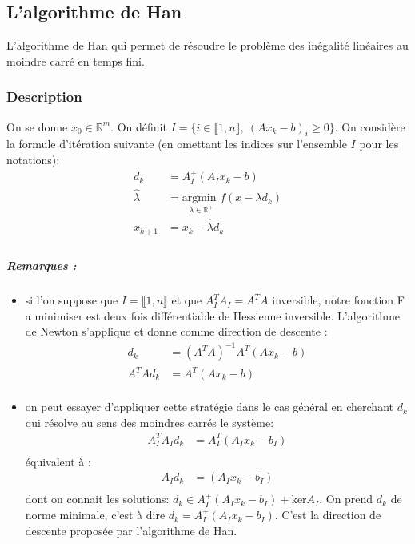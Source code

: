 \documentclass[10pt,a4paper]{article}
\begin{document}
\subsection{L'algorithme de Han}

L'algorithme de Han \cite{hanalgo} qui permet de résoudre le problème des inégalité linéaires au moindre carré en temps fini.

\subsubsection{Description}
On se donne $x_0 \in \mathbb{R}^m$.
On définit $I=\lbrace i \in \llbracket 1,n \rrbracket, \ (Ax_k - b)_i \ge 0 \rbrace$.
On considère la formule d'itération suivante (en omettant les indices sur l'ensemble $I$ pour les notations):
\begin{equation}
\begin{aligned}
  d_k & = A_I^+(A_I x_k - b)\\
  \widehat{\lambda} &= \underset{\lambda \in \mathbb{R}^+}{\text{argmin }}f(x - \lambda d_k)\\
  x_{k+1} & =x_k - \widehat{\lambda} d_k \\
  \end{aligned}
\end{equation}
\subparagraph{Remarques :}
\begin{itemize}
  \item si l'on suppose que $I = \llbracket 1,n \rrbracket$ et que $A_I^TA_I = A^TA$ inversible, notre fonction F a minimiser est deux fois différentiable de Hessienne inversible.
    L'algorithme de Newton  s'applique et donne comme direction de descente :
    \begin{equation}
\begin{aligned}
      d_k &= (A^TA)^{-1}A^T(A x_k - b) \\
      A^TA d_k &= A^T(A x_k - b) \\
    \end{aligned}
    \end{equation}
  \item on peut essayer d'appliquer cette stratégie dans le cas général en cherchant $d_k$ qui résolve au sens des moindres carrés le système:
    \begin{equation}
\begin{aligned}
      A_I^TA_I d_k &= A_I^T(A_I x_k - b_I) \\
    \end{aligned}
    \end{equation}
    équivalent à :
    \begin{equation}
\begin{aligned}
      A_I d_k &= (A_I x_k - b_I) \\
    \end{aligned}
    \end{equation}
    dont on connait les solutions: $d_k \in A_I^+(A_I x_k -b_I) + \text{ker}A_I$.
    On prend $d_k$ de norme minimale, c'est à dire $d_k = A_I^+(A_I x_k -b_I)$.
    C'est la direction de descente proposée par l'algorithme de Han.
\end{itemize}
\end{document}
